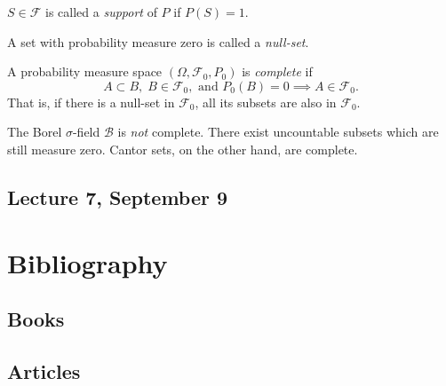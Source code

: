 \documentclass[11pt,fleqn]{book} %
\begin{document}
\begin{definition}[Support] \label{def:support}
	$S \in \mathcal{F}$ is called a \emph{support} of $P$ if $P(S)=1$.
\end{definition}

\begin{definition} \label{def:null-set}
	A set with probability measure zero is called a \emph{null-set}.
\end{definition}

\begin{definition}[Completeness] \label{def:completeness}
	A probability measure space $(\Omega,\mathcal{F}_0,P_0)$ is \emph{complete} if
	\[
		A \subset B, \; B \in \mathcal{F}_0, \textrm{ and } P_0(B) = 0 \implies A \in \mathcal{F}_0.
	\]
	That is, if there is a null-set in $\mathcal{F}_0$, all its subsets are also in $\mathcal{F}_0$.
\end{definition}

The Borel $\sigma$-field $\mathcal{B}$ is \emph{not} complete. There exist uncountable subsets which are still measure zero. Cantor sets, on the other hand, are complete.

\section{Lecture 7, September 9}


\chapter*{Bibliography}
\section*{Books}
\printbibliography[heading=bibempty,type=book]
\section*{Articles}
\printbibliography[heading=bibempty,type=article]


\cleardoublepage
{}
\setlength{\columnsep}{0.75cm}
\printindex

\end{document}
